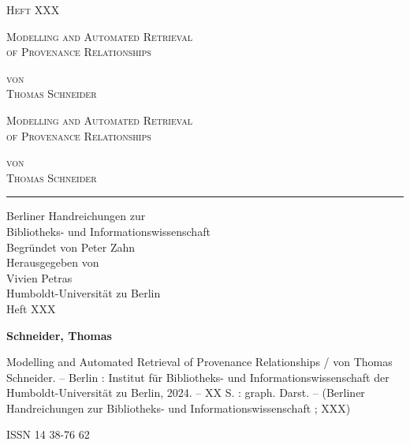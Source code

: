\begin{titlepage}
\vspace{2cm}

{\LARGE \scshape Heft XXX \par} %

\vspace{2,5cm}

{\Large \scshape Modelling and Automated Retrieval \\ of Provenance Relationships \par}

\vspace{2cm}

{\LARGE \scshape von \\ Thomas Schneider}

\end{titlepage}

\clearpage{\thispagestyle{empty}\cleardoublepage}
\clearpage{\thispagestyle{empty}\cleardoublepage}
\centering
\phantom{x}
\vspace{5cm}

{\Large \scshape Modelling and Automated Retrieval \\ of Provenance Relationships \par}

\vspace{4cm}

{\Large \scshape von \\ Thomas Schneider \par}

\vspace{3cm}
\hrule
\vspace{1cm}
\raggedleft
{\Large Berliner Handreichungen zur \\
Bibliotheks- und Informationswissenschaft \\
\vspace{1cm}
Begründet von Peter Zahn \\
Herausgegeben von \\
Vivien Petras \\
Humboldt-Universität zu Berlin \\
\vspace{.5cm}
Heft XXX} %

\newpage
\thispagestyle{empty}
\justifying
\phantom{x}
\vspace{.5cm}

{ \large \textbf{Schneider, Thomas} \par

Modelling and Automated Retrieval of Provenance Relationships
/ von Thomas Schneider. -- Berlin : Institut für Bibliotheks- und Informationswissenschaft
der Humboldt-Universität zu Berlin, 2024. -- XX S. : graph. Darst. -- (Berliner Handreichungen zur Bibliotheks- und Informationswissenschaft
; XXX) \par %

 ISSN 14 38-76 62 \par} %


